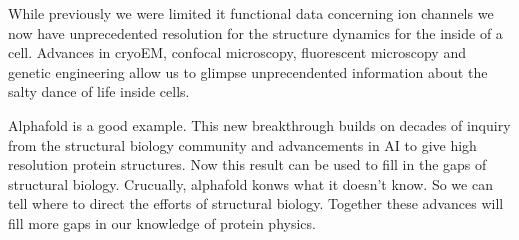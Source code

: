 While previously we were limited it functional data concerning ion channels we now have unprecedented resolution for the structure dynamics for the inside of a cell. Advances in cryoEM, confocal microscopy, fluorescent microscopy and genetic engineering allow us to glimpse unprecendented information about the salty dance of life inside cells.

Alphafold is a good example. This new breakthrough builds on decades of inquiry from the structural biology community and advancements in AI to give high resolution protein structures. Now this result can be used to fill in the gaps of structural biology. Crucually, alphafold konws what it doesn't know. So we can tell where to direct the efforts of structural biology. Together these advances will fill more gaps in our knowledge of protein physics. 
